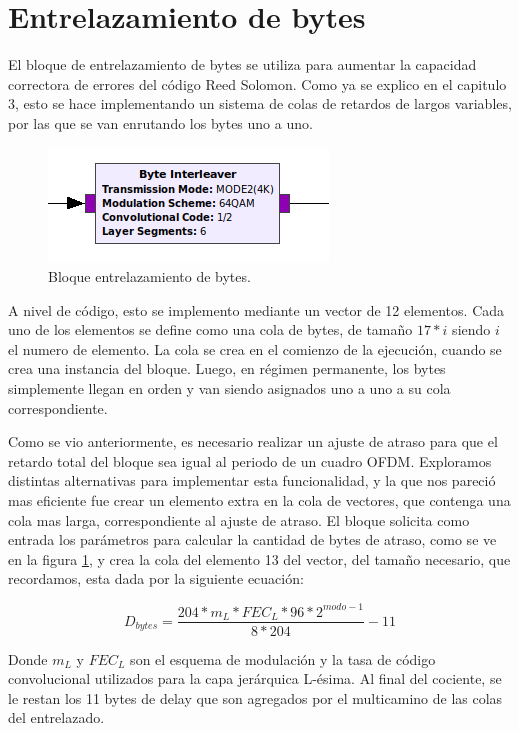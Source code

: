 \section{Entrelazamiento de bytes}

El bloque de entrelazamiento de bytes se utiliza para aumentar la capacidad correctora de errores del código Reed Solomon. Como ya se explico en el capitulo 3, esto se hace implementando un sistema de colas de retardos de largos variables, por las que se van enrutando los bytes uno a uno. 

\begin{figure}[!h]
	\centering
	\includegraphics[scale=0.6]{figuras/cap05/byteint}
	\caption{\label{f:byteint} Bloque entrelazamiento de bytes.}
\end{figure}

A nivel de código, esto se implemento mediante un vector de 12 elementos. Cada uno de los elementos se define como una cola de bytes, de tamaño $17*i$ siendo $i$ el numero de elemento. La cola se crea en el comienzo de la ejecución, cuando se crea una instancia del bloque. Luego, en régimen permanente, los bytes simplemente llegan en orden y van siendo asignados uno a uno a su cola correspondiente.

Como se vio anteriormente, es necesario realizar un ajuste de atraso para que el retardo total del bloque sea igual al periodo de un cuadro OFDM. Exploramos distintas alternativas para implementar esta funcionalidad, y la que nos pareció mas eficiente fue crear un elemento extra en la cola de vectores, que contenga una cola mas larga, correspondiente al ajuste de atraso. El bloque solicita como entrada los parámetros para calcular la cantidad de bytes de atraso, como se ve en la figura \ref{f:byteint}, y crea la cola del elemento 13 del vector, del tamaño necesario, que recordamos, esta dada por la siguiente ecuación:

\begin{equation}
D_{bytes} = \frac{204*m_L*FEC_L*96*2^{modo-1}}{8*204} - 11
\end{equation}

Donde $m_L$ y $FEC_L$ son el esquema de modulación y la tasa de código convolucional utilizados para la capa jerárquica L-ésima. Al final del cociente, se le restan los 11 bytes de delay que son agregados por el multicamino de las colas del entrelazado.

